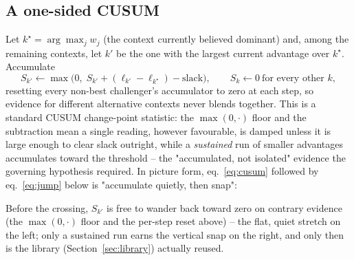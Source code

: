 \documentclass[11pt,a4paper]{article}
\begin{document}
\subsection{A one-sided CUSUM}
\label{sec:cusum-stat}
Let $k^\star=\arg\max_j w_j$ (the context currently believed dominant) and, among the
remaining contexts, let $k'$ be the one with the largest current advantage over
$k^\star$. Accumulate
\begin{equation}\label{eq:cusum}
S_{k'}\leftarrow\max\bigl(0,\;S_{k'}+(\ell_{k'}-\ell_{k^\star})-\text{slack}\bigr),
\qquad S_k\leftarrow0\ \text{for every other }k,
\end{equation}
resetting every non-best challenger's accumulator to zero at each step, so evidence for
different alternative contexts never blends together. This is a standard CUSUM
change-point statistic: the $\max(0,\cdot)$ floor and the  subtraction mean
a single reading, however favourable, is damped unless it is large enough to clear
slack outright, while a \emph{sustained} run of smaller advantages accumulates toward
the threshold -- the "accumulated, not isolated" evidence the governing hypothesis
required. In picture form, eq.~\eqref{eq:cusum} followed by eq.~\eqref{eq:jump} below is "accumulate quietly, then snap":
\begin{center}
\end{center}
Before the crossing, $S_{k'}$ is free to wander back toward zero on contrary evidence
(the $\max(0,\cdot)$ floor and the per-step reset above) -- the flat, quiet stretch on
the left; only a sustained run earns the vertical snap on the right, and only then is
the library (Section~\ref{sec:library}) actually reused.
\end{document}
